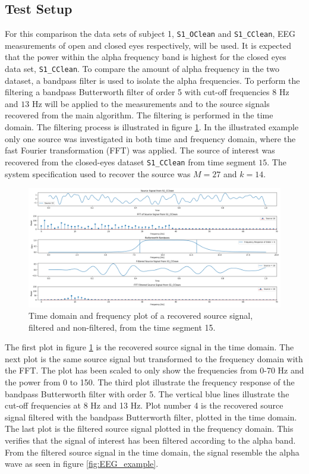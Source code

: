\subsection{Test Setup}
For this comparison the data sets of subject 1, \texttt{S1\_OClean} and \texttt{S1\_CClean}, EEG measurements of open and closed eyes respectively, will be used. 
It is expected that the power within the alpha frequency band is highest for the closed eyes data set, \texttt{S1\_CClean}.
To compare the amount of alpha frequency in the two dataset, a bandpass filter is used to isolate the alpha frequencies. 
To perform the filtering a bandpass Butterworth filter of order 5 with cut-off frequencies $8$ Hz and $13$ Hz will be applied to the measurements and to the source signals recovered from the main algorithm. The filtering is performed in the time domain. 
The filtering process is illustrated in figure \ref{fig:dft_1}.
In the illustrated example only one source was investigated in both time and frequency domain, where the fast Fourier transformation (FFT) was applied\cite{??}.  The source of interest was recovered from the closed-eyes dataset \texttt{S1\_CClean} from time segment $15$. The system specification used to recover the source was $M=27$ and $k=14$.
\begin{figure}[H]
\centering
\includegraphics[scale=0.28]{figures/ch_7/DFT_plot_X_timeseg15_source10.png}
\caption{Time domain and frequency plot of a recovered source signal, filtered and non-filtered, from the time segment 15.}
\label{fig:dft_1}
\end{figure}
\noindent
The first plot in figure \ref{fig:dft_1} is the recovered source signal in the time domain. The next plot is the same source signal but transformed to the frequency domain with the FFT. The plot has been scaled to only show the frequencies from 0-70 Hz and the power from 0 to 150. The third plot illustrate the frequency response of the bandpass Butterworth filter with order 5. The vertical blue lines illustrate the cut-off frequencies at 8 Hz and 13 Hz.
Plot number 4 is the recovered source signal filtered with the bandpass Butterworth filter, plotted in the time domain. The last plot is the filtered source signal plotted in the frequency domain. This verifies that the signal of interest has been filtered according to the alpha band. From the filtered source signal in the time domain, the signal resemble the alpha wave as seen in figure \ref{fig:EEG_example}.

